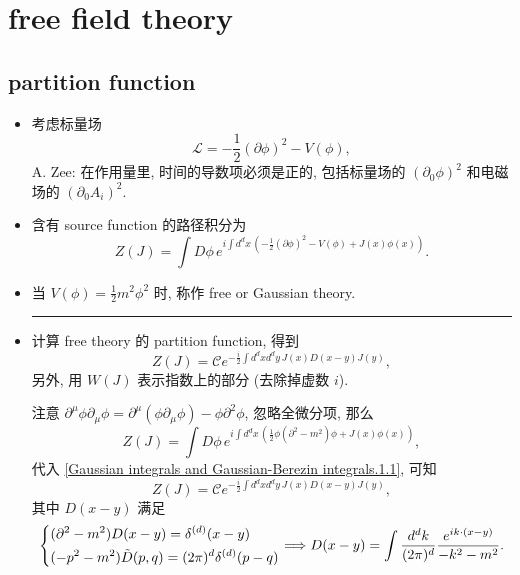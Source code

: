 \chapter{free field theory}
\section{partition function}
\begin{itemize}
	\item 考虑标量场
	\begin{equation}
		\mathcal{L} = - \frac{1}{2} (\partial \phi)^2 - V(\phi),
	\end{equation}
	A. Zee: 在作用量里, 时间的导数项必须是正的, 包括标量场的 $(\partial_0 \phi)^2$ 和电磁场的 $(\partial_0 A_i)^2$.
	
	\item 含有 source function 的路径积分为
	\begin{equation}
		Z(J) = \int D\phi \, e^{i \int d^d x \, (- \frac{1}{2} (\partial \phi)^2 - V(\phi) + J(x) \phi(x))}.
	\end{equation}
	
	\item 当 $V(\phi) = \frac{1}{2} m^2 \phi^2$ 时, 称作 free or Gaussian theory.
	
	\noindent\rule[0.5ex]{\linewidth}{0.5pt} %
	
	\item 计算 free theory 的 partition function, 得到
	\begin{equation} \label{free field theory.1.3}
		Z(J) = \mathcal{C} e^{- \frac{i}{2} \int d^d x d^d y \, J(x) D(x - y) J(y)},
	\end{equation}
	另外, 用 $W(J)$ 表示指数上的部分 (去除掉虚数 $i$).
	
	\begin{tcolorbox}[title=proof:]
		注意 $\partial^\mu \phi \partial_\mu \phi = \partial^\mu(\phi \partial_\mu \phi) - \phi \partial^2 \phi$, 忽略全微分项, 那么
		\begin{equation} \label{free field theory.1.4}
			Z(J) = \int D\phi \, e^{i \int d^d x \, (\frac{1}{2} \phi (\partial^2 - m^2) \phi + J(x) \phi(x))},
		\end{equation}
		代入 \eqref{Gaussian integrals and Gaussian-Berezin integrals.1.1}, 可知
		\begin{equation}
			Z(J) = \mathcal{C} e^{- \frac{i}{2} \int d^d x d^d y \, J(x) D(x - y) J(y)},
		\end{equation}
		其中 $D(x - y)$ 满足
		\begin{equation} \label{free field theory.1.6}
			\begin{dcases}
				(\partial^2 - m^2) D(x - y) = \delta^{(d)}(x - y) \\
				(- p^2 - m^2) \tilde{D}(p, q) = (2 \pi)^d \delta^{(d)}(p - q)
			\end{dcases} \Longrightarrow D(x - y) = \int \frac{d^d k}{(2 \pi)^d} \frac{e^{i k \cdot (x - y)}}{- k^2 - m^2}.
		\end{equation}
	\end{tcolorbox}
\end{itemize}

